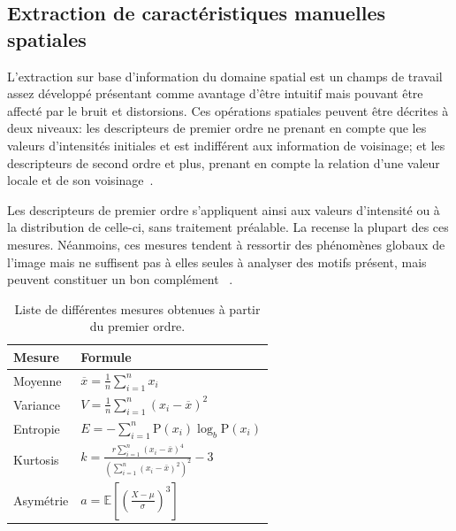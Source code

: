 \subsection{Extraction de caractéristiques manuelles spatiales}
L'extraction sur base d'information du domaine spatial est un champs de travail assez développé présentant comme avantage d'être intuitif mais pouvant être affecté par le bruit et distorsions. Ces opérations spatiales peuvent être décrites à deux niveaux: les descripteurs de premier ordre ne prenant en compte que les valeurs d'intensités initiales et est indifférent aux information de voisinage; et les descripteurs de second ordre et plus, prenant en compte la relation d'une valeur locale et de son voisinage~\cite{Kamila2015}.\par

Les descripteurs de premier ordre s'appliquent ainsi aux valeurs d'intensité ou à la distribution de celle-ci, sans traitement préalable. La  recense la plupart des ces mesures. Néanmoins, ces mesures tendent à ressortir des phénomènes globaux de l'image mais ne suffisent pas à elles seules à analyser  des motifs présent, mais peuvent constituer un bon complément ~\cite{Tomita1990, Srinivasan2008, Uyun2013, NyeinNyeinHlaing2015}.\par

\begin{table}[H]
    \centering
    \begin{tabular}{ll}
        \toprule
        \textbf{Mesure}             & \textbf{Formule}                                                  \\ \hline
        Moyenne                     & $\overline{x} = \frac{1}{n}\sum_{i=1}^n x_i$                      \\   
        Variance                    & $V = \frac{1}{n}\sum_{i=1}^n \left(x_i - \overline{x}\right)^2$   \\ 
        Entropie                    & $E = -\sum_{i=1}^n {\mathrm{P}(x_i) \log_b \mathrm{P}(x_i)}$\\
        Kurtosis                    & $k=\frac{r \sum_{i=1}^{n}\left(x_{i}-\bar{x}\right)^{4}}{\left(\sum_{i=1}^{n}\left(x_{i}-\bar{x}\right)^{2}\right)^{2}}-3$\\
        Asymétrie                   & $a = \mathbb{E} \left[ \left( \frac{X - \mu}{\sigma} \right)^3 \right]$\\  
        \bottomrule
    \end{tabular}
    \caption{Liste de différentes mesures obtenues à partir du premier ordre.}
    \label{tab:first_order_descriptors}
\end{table}\par

